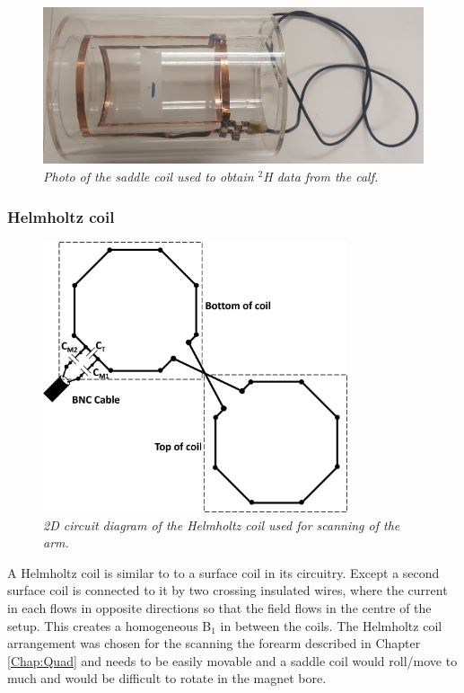 \begin{figure}
    \centering
    \includegraphics[width=1\textwidth]{Figures/Theory/Saddle_Coil.jpg}
    \caption{\textit{Photo of the saddle coil used to obtain $^2$H data from the calf.}}
    \label{fig:theory:Saddle_pic}
\end{figure}

\subsubsection{Helmholtz coil}

\begin{figure}
    \centering
    \includegraphics[width=0.8\textwidth]{Figures/Theory/Planar_Helmholtz.png}
    \caption{\textit{2D circuit diagram of the Helmholtz coil used for scanning of the arm.}}
    \label{fig:theory:2D_Helmholtz}
\end{figure}

A Helmholtz coil is similar to to a surface coil in its circuitry. Except a second surface coil is connected to it by two crossing insulated wires, where the current in each flows in opposite directions so that the field flows in the centre of the setup. This creates a homogeneous B$_1$ in between the coils. The Helmholtz coil arrangement was chosen for the scanning the forearm described in Chapter \ref{Chap:Quad} and needs to be easily movable and a saddle coil would roll/move to much and would be difficult to rotate in the magnet bore.

